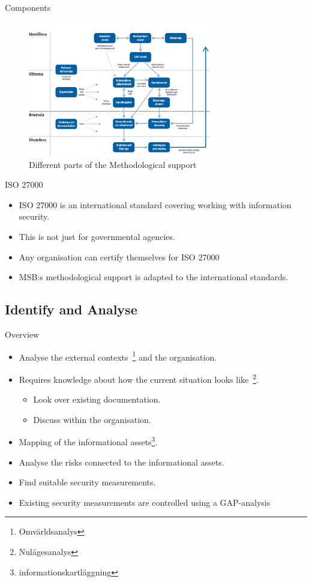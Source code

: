 \documentclass{beamer}
\begin{document}
\begin{frame}{Components}{\insertsectionhead}
  \begin{figure}
    \includegraphics[width=8cm]{Figures/oversiktsbild-over-metodstegens-olika-delar-och-hur-de-relaterar-till-varandra.png}
    \caption{Different parts of the Methodological support~\cite{msb_metodstod}}
  \end{figure}
\end{frame}

\begin{frame}{ISO 27000}{\insertsectionhead}
  \begin{itemize}
    \item ISO 27000 is an international standard covering working with
      information security.
    \item This is not just for governmental agencies.
    \item Any organisation can certify themselves for ISO 27000
    \item MSB:s methodological support is adapted to the international
      standards.
  \end{itemize}
\end{frame}

\subsection{Identify and Analyse}
\begin{frame}{Overview}{\insertsubsectionhead}
  \begin{itemize}
    \item Analyse the external contexts~\footnote{Omvärldsanalys} and the organisation.
    \item Requires knowledge about how the current situation looks
      like~\footnote{Nulägesanalys}.
      \begin{itemize}
        \item Look over existing documentation.
        \item Discuss within the organisation.
      \end{itemize}
    \item Mapping of the informational assets\footnote{informationskartläggning}.
    \item Analyse the risks connected to the informational assets.
    \item Find suitable security measurements.
    \item Existing security measurements are controlled using a GAP-analysis
  \end{itemize}
\end{frame}
\end{document}
